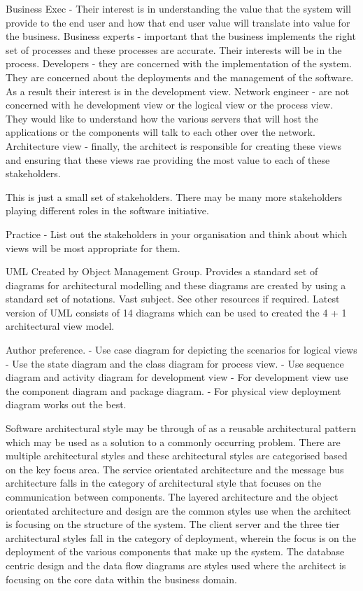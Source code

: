 Business Exec - Their interest is in understanding the value that the system will provide to the end user and how that end user value will translate into value for the business.
Business experts - important that the business implements the right set of processes and these processes are accurate. Their interests will be in the process.
Developers - they are concerned with the implementation of the system.
They are concerned about the deployments and the management of the software.
As a result their interest is in the development view.
Network engineer - are not concerned with he development view or the logical view or the process view.
They would like to understand how the various servers that will host the applications or the components will talk to each other over the network.
Architecture view - finally, the architect is responsible for creating these views and ensuring that these views rae providing the most value to each of these stakeholders.

This is just a small set of stakeholders.
There may be many more stakeholders playing different roles in the software initiative.

Practice
- List out the stakeholders in your organisation and think about which views will be most appropriate for them.


UML
Created by Object Management Group.
Provides a standard set of diagrams for architectural modelling and these diagrams are created by using a standard set of notations.
Vast subject.
See other resources if required.
Latest version of UML consists of 14 diagrams which can be used to created the 4 + 1 architectural view model.

Author preference.
- Use case diagram for depicting the scenarios for logical views
- Use the state diagram and the class diagram for process view.
- Use sequence diagram and activity diagram for development view
- For development view use the component diagram and package diagram.
- For physical view deployment diagram works out the best.

Software architectural style may be through of as a reusable architectural pattern which may be used as a solution to a commonly occurring problem.
There are multiple architectural styles and these architectural styles are categorised based on the key focus area.
The service orientated architecture and the message bus architecture falls in the category of architectural style that focuses on the communication between components.
The layered architecture and the object orientated architecture and design are the common styles use when the architect is focusing on the structure of the system.
The client server and the three tier architectural styles fall in the category of deployment, wherein the focus is on the deployment of the various components that make up  the system.
The database centric design and the data flow diagrams are styles used where the architect is focusing on the core data within the business domain.


